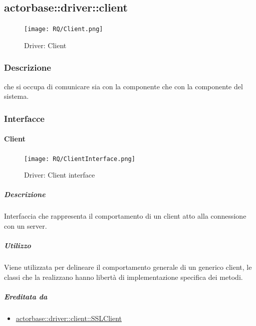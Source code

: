 \documentclass{scalatekids-article}
\begin{document}
\subsection{actorbase::driver::client}
\label{sec:actorbase::driver::client}

\begin{figure}[H]
  \begin{center}
    \texttt{[image: RQ/Client.png]}
    \caption{Driver: Client}
  \end{center}
\end{figure}

\subsubsection{Descrizione}

 che si occupa di comunicare sia con la componente 
che con la componente  del sistema.

\subsubsection{Interfacce}

\paragraph{Client}
\label{sec:actorbase::driver::client::Client}

\begin{figure}[H]
  \begin{center}
    \texttt{[image: RQ/ClientInterface.png]}
    \caption{Driver: Client interface}
  \end{center}
\end{figure}

\subparagraph{Descrizione}

Interfaccia che rappresenta il comportamento di un client atto alla connessione con un server.

\subparagraph{Utilizzo}

Viene utilizzata per delineare il comportamento generale di un generico client,
le classi che la realizzano hanno libertà di implementazione specifica dei
metodi.

\subparagraph{Ereditata da}

\begin{itemize}
\item \hyperref[sec:actorbase::driver::client::SSLClient]{actorbase::driver::client::SSLClient}
\end{itemize}
\end{document}
